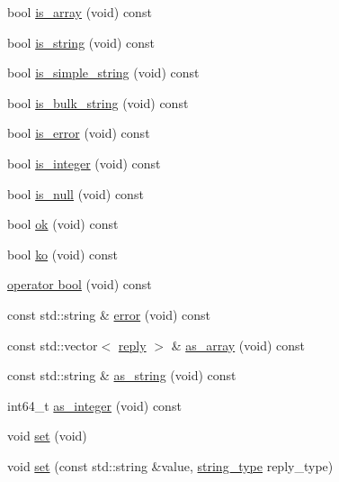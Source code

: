 \begin{DoxyCompactItemize}
bool \hyperlink{classcpp__redis_1_1reply_a3a94881a46125d281cb36191c4b7d19a}{is\+\_\+array} (void) const
\item 
bool \hyperlink{classcpp__redis_1_1reply_a7072729490fdbad26ddeb02df8002147}{is\+\_\+string} (void) const
\item 
bool \hyperlink{classcpp__redis_1_1reply_aeb92f6f84d226239e9800893ab6062ca}{is\+\_\+simple\+\_\+string} (void) const
\item 
bool \hyperlink{classcpp__redis_1_1reply_ab1f4e57a33fb438ab165a65f2d31ca8d}{is\+\_\+bulk\+\_\+string} (void) const
\item 
bool \hyperlink{classcpp__redis_1_1reply_af61ba1b5a0617c0036fb69e7ad5ee159}{is\+\_\+error} (void) const
\item 
bool \hyperlink{classcpp__redis_1_1reply_a75216234d6aafd8f81025b22bdbb4440}{is\+\_\+integer} (void) const
\item 
bool \hyperlink{classcpp__redis_1_1reply_ac9a967c09aad1cdc7ec3459a330ab274}{is\+\_\+null} (void) const
\item 
bool \hyperlink{classcpp__redis_1_1reply_a1270c4197e0ce79df996565f44011ac0}{ok} (void) const
\item 
bool \hyperlink{classcpp__redis_1_1reply_a17e261cc8e7686bb2126d7df9223611a}{ko} (void) const
\item 
\hyperlink{classcpp__redis_1_1reply_a74ef4651c068bfc68436f7e3c7a9a2e6}{operator bool} (void) const
\item 
const std\+::string \& \hyperlink{classcpp__redis_1_1reply_a8e4d3fe1636627fdee6361705a2b1c1e}{error} (void) const
\item 
const std\+::vector$<$ \hyperlink{classcpp__redis_1_1reply}{reply} $>$ \& \hyperlink{classcpp__redis_1_1reply_af4ead6a79c9e531912c35267d5212776}{as\+\_\+array} (void) const
\item 
const std\+::string \& \hyperlink{classcpp__redis_1_1reply_a5fdd9c1d3bb3b9ece6098f8b83a32597}{as\+\_\+string} (void) const
\item 
int64\+\_\+t \hyperlink{classcpp__redis_1_1reply_a5f54d0dada956bca564ff2d7bde866ea}{as\+\_\+integer} (void) const
\item 
void \hyperlink{classcpp__redis_1_1reply_a2489d293128b2d567663a9d7fbbbc33e}{set} (void)
\item 
void \hyperlink{classcpp__redis_1_1reply_a9306dcc36a6a009a2b0f4923735f6349}{set} (const std\+::string \&value, \hyperlink{classcpp__redis_1_1reply_ac192ba4cb8f2bb6e7cb465edf755328b}{string\+\_\+type} reply\+\_\+type)
\item 

\end{DoxyCompactItemize}
